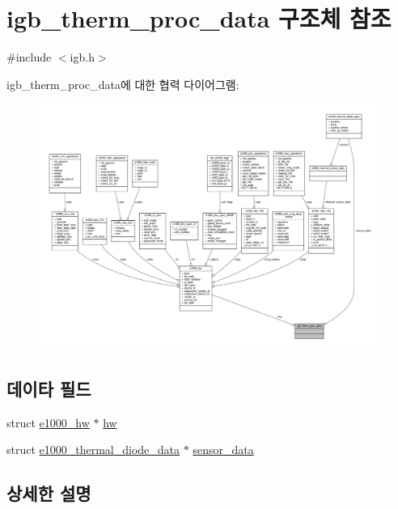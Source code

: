 \hypertarget{structigb__therm__proc__data}{}\section{igb\+\_\+therm\+\_\+proc\+\_\+data 구조체 참조}
\label{structigb__therm__proc__data}


{\ttfamily \#include $<$igb.\+h$>$}



igb\+\_\+therm\+\_\+proc\+\_\+data에 대한 협력 다이어그램\+:
\nopagebreak
\begin{figure}[H]
\begin{center}
\leavevmode
\includegraphics[width=350pt]{structigb__therm__proc__data__coll__graph}
\end{center}
\end{figure}
\subsection*{데이타 필드}
\begin{DoxyCompactItemize}
\item 
struct \hyperlink{structe1000__hw}{e1000\+\_\+hw} $\ast$ \hyperlink{structigb__therm__proc__data_ae0389b77e987f85762ff0d87ce4e76fc}{hw}
\item 
struct \hyperlink{structe1000__thermal__diode__data}{e1000\+\_\+thermal\+\_\+diode\+\_\+data} $\ast$ \hyperlink{structigb__therm__proc__data_a18e5c745a0c698a5c948b2020bc5f8f5}{sensor\+\_\+data}
\end{DoxyCompactItemize}


\subsection{상세한 설명}


